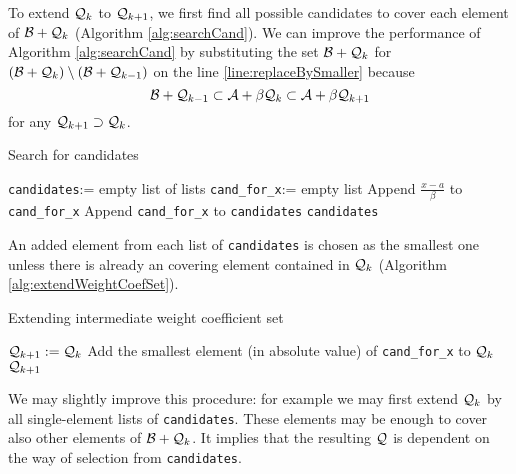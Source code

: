 To extend $\mathcal{Q}_{k}$ to $\mathcal{Q}_{k+1}$, we first find all possible candidates to cover each element of  $\mathcal{B} + \mathcal{Q}_{k}$ (Algorithm \ref{alg:searchCand}). We can improve the performance of Algorithm \ref{alg:searchCand} by substituting the set $\mathcal{B} + \mathcal{Q}_{k}$ for $(\mathcal{B} + \mathcal{Q}_{k})\setminus (\mathcal{B} + \mathcal{Q}_{k-1})$ on the line \ref{line:replaceBySmaller} because
$$
\mathcal{B} + \mathcal{Q}_{k-1} \subset \mathcal{A} + \beta \mathcal{Q}_{k} \subset \mathcal{A} + \beta \mathcal{Q}_{k+1}
$$
for any $\mathcal{Q}_{k+1} \supset \mathcal{Q}_{k}$.

\begin{algorithm}
  \caption{Search for candidates}
    \label{alg:searchCand}
  \begin{algorithmic}[1]
    \STATE \verb+candidates+:= empty list of lists
     \label{line:replaceBySmaller}
      \STATE \verb+cand_for_x+:= empty list
              \STATE Append $\frac{x-a}{\beta}$ to \verb+cand_for_x+
            \ENDIF
      \ENDFOR 
      \STATE Append \verb+cand_for_x+ to \verb+candidates+
  \ENDFOR
  \RETURN \verb+candidates+
  \end{algorithmic}
\end{algorithm}  


An added element from each list of \verb+candidates+ is chosen as the smallest one unless there is already an covering element contained in $\mathcal{Q}_{k}$ (Algorithm \ref{alg:extendWeightCoefSet}).  

\begin{algorithm}
  \caption{Extending intermediate weight coefficient set}
    \label{alg:extendWeightCoefSet}
  \begin{algorithmic}[1]
    \STATE $\mathcal{Q}_{k+1}:=\mathcal{Q}_{k}$
            \STATE Add the smallest element (in absolute value) of  \verb+cand_for_x+ to $\mathcal{Q}_{k}$  
        \ENDIF
    \ENDFOR
    \RETURN $\mathcal{Q}_{k+1}$
  \end{algorithmic}
\end{algorithm}
    
We may slightly improve this procedure: for example we may first extend $\mathcal{Q}_{k}$ by all single-element lists of \verb+candidates+. These elements may be enough to cover also other elements of $\mathcal{B}+\mathcal{Q}_{k}$. It implies that the resulting $\mathcal{Q}$ is dependent on the way of selection from \verb+candidates+.
  
